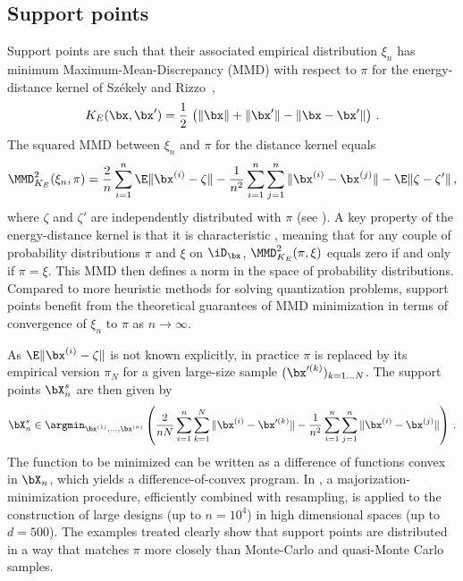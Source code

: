 \subsection{Support points}\label{sec:SP}
Support points \citep{mak_joseph_2018} are such that their associated empirical distribution $\xi_n$ has minimum Maximum-Mean-Discrepancy (MMD) with respect to $\pi$ for the energy-distance kernel of Sz\'ekely and Rizzo~\citep{szekely_rizzo_2013},
\begin{equation}\label{eq:kE}
K_E(\bx,\bx') = \frac12\, \left(\Vert \bx \Vert + \Vert \bx' \Vert - \Vert \bx-\bx' \Vert\right)\,.
\end{equation} 
The squared MMD between $\xi_n$ and $\pi$ for the distance kernel equals
\begin{equation}\label{eq:energySP}
\MMD_{K_E}^2(\xi_n,\pi) = \frac{2}{n} \sum_{i=1}^{n} \E \|\bx^{(i)}-\zeta\| - \frac{1}{n^2} \sum_{i=1}^{n}\sum_{j=1}^{n} \|\bx^{(i)}-\bx^{(j)}\| - \E \|\zeta-\zeta'\| \,,
\end{equation}
where $\zeta$ and $\zeta'$ are independently distributed with $\pi$ (see \citealp{sejdinovic_2013}).
A key property of the energy-distance kernel is that it is characteristic \citep{sriperumbudur_2010}, meaning that for any couple of probability distributions $\pi$ and $\xi$ on $\iD_\bx$, $\MMD_{K_E}^2(\pi,\xi)$ equals zero if and only if $\pi=\xi$. 
This MMD then defines a norm in the space of probability distributions.
Compared to more heuristic methods for solving quantization problems, support points benefit from the theoretical guarantees of MMD minimization in terms of convergence of $\xi_n$ to $\pi$ as $n\to\infty$. 

As $\E \|\bx^{(i)}-\zeta\|$ is not known explicitly, in practice $\pi$ is replaced by its empirical version $\pi_N$ for a given large-size sample $(\bx'^{(k)})_{k=1\ldots N}$. 
The support points $\bX_n^s$ are then given by
\begin{equation}\label{eq:SPestim}
\bX_n^s \in \argmin_{\bx^{(1)},\ldots,\bx^{(n)}} \left( \frac{2}{n N} \sum_{i=1}^{n} \sum_{k=1}^N \|\bx^{(i)}-\bx'^{(k)}\| - \frac{1}{{n}^2} \sum_{i=1}^{n}\sum_{j=1}^{n} \|\bx^{(i)}-\bx^{(j)}\| \right) \,.
\end{equation}
The function to be minimized can be written as a difference of functions convex in $\bX_n$, which yields a difference-of-convex program. 
In \citet{mak_joseph_2018}, a majorization-minimization procedure, efficiently combined with resampling, is applied to the construction of large designs (up to $n=10^4$) in high dimensional spaces (up to $d=500$). 
The examples treated clearly show that support points are distributed in a way that matches $\pi$ more closely than Monte-Carlo and quasi-Monte Carlo samples.

